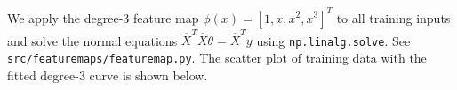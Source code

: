 \begin{answer}
We apply the degree-3 feature map $\phi(x)=[1,x,x^2,x^3]^T$ to all training inputs and solve the normal equations $\hat{X}^T\hat{X}\theta = \hat{X}^Ty$ using \texttt{np.linalg.solve}. See \texttt{src/featuremaps/featuremap.py}. The scatter plot of training data with the fitted degree-3 curve is shown below.
\end{answer}
